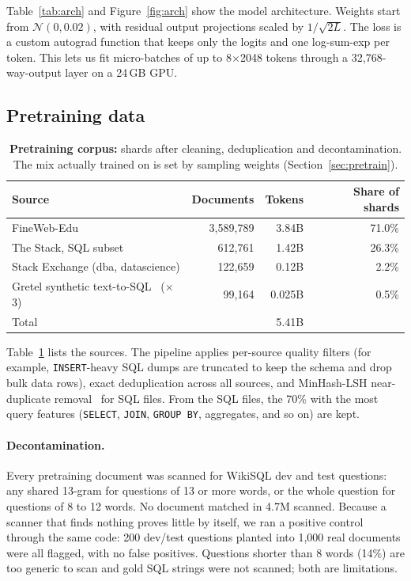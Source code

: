 \documentclass[11pt]{article}
\begin{document}
Table~\ref{tab:arch} and Figure~\ref{fig:arch} show the model architecture. Weights start from $\mathcal{N}(0, 0.02)$, with residual output projections scaled by $1/\sqrt{2L}$. The loss is a custom autograd function that keeps only the logits and one log-sum-exp per token. This lets us fit micro-batches of up to 8$\times$2048 tokens through a 32,768-way-output layer on a 24\,GB GPU.

\subsection{Pretraining data}

\begin{table}[t]
\centering
\small
\begin{tabular}{lrrr}
\toprule
Source & Documents & Tokens & Share of shards \\
\midrule
FineWeb-Edu~\cite{penedo2024fineweb} & 3,589,789 & 3.84B & 71.0\% \\
The Stack, SQL subset~\cite{kocetkov2022stack} & 612,761 & 1.42B & 26.3\% \\
Stack Exchange (dba, datascience) & 122,659 & 0.12B & 2.2\% \\
Gretel synthetic text-to-SQL~\cite{gretel2024synthetic} ($\times$3) & 99,164 & 0.025B & 0.5\% \\
\midrule
Total & & 5.41B & \\
\bottomrule
\end{tabular}
\caption{\textbf{Pretraining corpus:} shards after cleaning, deduplication and decontamination. The mix actually trained on is set by sampling weights (Section~\ref{sec:pretrain}).}
\label{tab:data}
\end{table}

Table~\ref{tab:data} lists the sources. The pipeline applies per-source quality filters (for example, \texttt{INSERT}-heavy SQL dumps are truncated to keep the schema and drop bulk data rows), exact deduplication across all sources, and MinHash-LSH near-duplicate removal~\cite{broder1997minhash} for SQL files. From the SQL files, the 70\% with the most query features (\texttt{SELECT}, \texttt{JOIN}, \texttt{GROUP BY}, aggregates, and so on) are kept.

\paragraph{Decontamination.} Every pretraining document was scanned for WikiSQL dev and test questions: any shared 13-gram for questions of 13 or more words, or the whole question for questions of 8 to 12 words. No document matched in 4.7M scanned. Because a scanner that finds nothing proves little by itself, we ran a positive control through the same code: 200 dev/test questions planted into 1,000 real documents were all flagged, with no false positives. Questions shorter than 8 words (14\%) are too generic to scan and gold SQL strings were not scanned; both are limitations.
\end{document}
